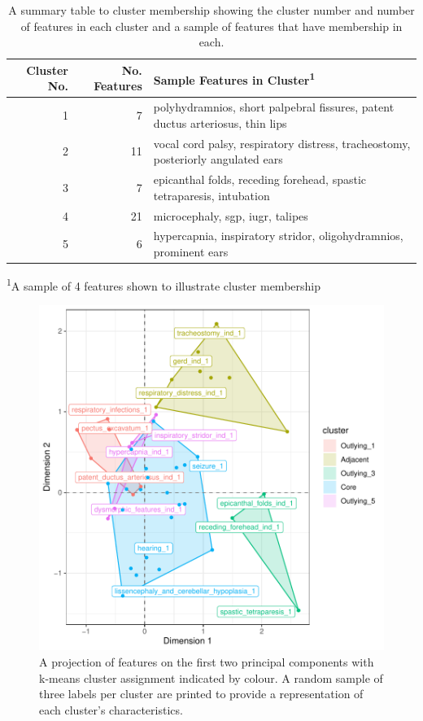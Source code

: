 \documentclass[
  authoryear,
  preprint,
  3p]{elsarticle}
\begin{document}
\hypertarget{tbl-clusttab}{}
\setlength{\LTpost}{0mm}
\begin{longtable}{rrl}
\caption{\label{tbl-clusttab}A summary table to cluster membership showing the cluster number and
number of features in each cluster and a sample of features that have
membership in each. }\tabularnewline

\toprule
Cluster No. & No. Features & Sample Features in Cluster\textsuperscript{1} \\ 
\midrule
1 & 7 & polyhydramnios, short palpebral fissures, patent ductus arteriosus, thin lips \\ 
2 & 11 & vocal cord palsy, respiratory distress, tracheostomy, posteriorly angulated ears \\ 
3 & 7 & epicanthal folds, receding forehead, spastic tetraparesis, intubation \\ 
4 & 21 & microcephaly, sgp, iugr, talipes \\ 
5 & 6 & hypercapnia, inspiratory stridor, oligohydramnios, prominent ears \\ 
\bottomrule
\end{longtable}
\begin{minipage}{\linewidth}
\textsuperscript{1}A sample of 4 features shown to illustrate cluster membership\\
\end{minipage}

\begin{figure}

{\centering \includegraphics{paper_files/figure-pdf/fig-clust-1.pdf}

}

\caption{\label{fig-clust}A projection of features on the first two
principal components with k-means cluster assignment indicated by
colour. A random sample of three labels per cluster are printed to
provide a representation of each cluster's characteristics.}

\end{figure}
\end{document}
